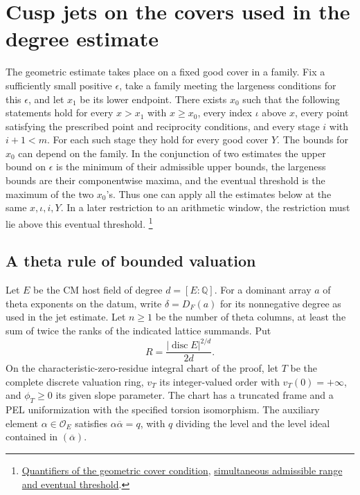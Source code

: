 \section{Cusp jets on the covers used in the degree estimate}
\label{sec:cusp-jets}

The geometric estimate takes place on a fixed good cover in a family.
Fix a sufficiently small positive \(\epsilon\), take a family meeting
the largeness conditions for this \(\epsilon\), and let \(x_1\) be its
lower endpoint. There exists \(x_0\) such that the following statements
hold for every \(x>x_1\) with \(x\ge x_0\), every index \(\iota\)
above \(x\), every point satisfying the prescribed point and
reciprocity conditions, and every stage \(i\) with \(i+1<m\).
For each such stage they hold for every good cover \(Y\).
The bounds for \(x_0\) can depend on the family. In the conjunction
of two estimates the upper bound on \(\epsilon\) is the minimum of
their admissible upper bounds, the largeness bounds are their
componentwise maxima, and the eventual threshold is the maximum of
the two \(x_0\)'s. Thus one can apply all the estimates below at the
same \(x,\iota,i,Y\). In a later restriction to an arithmetic
window, the restriction must lie above this eventual threshold.
\footnote{\href{https://github.com/Deicyde/riemann-hypothesis/blob/40e56bab/src/Development/AutomorphicArithmetic/ThetaCorrespondence/ThetaPairLifts/ThirdPlaceSeries/LiftLambdaBound.lean\#L17-L32}{Quantifiers of the geometric cover condition},
\href{https://github.com/Deicyde/riemann-hypothesis/blob/40e56bab/src/Development/AutomorphicArithmetic/ThetaCorrespondence/ThetaPairLifts/ThirdPlaceSeries/ExistsCuspWithThetaJetValueLe.lean\#L24-L43}{simultaneous admissible range and eventual threshold}.}

\subsection{A theta rule of bounded valuation}

Let \(E\) be the CM host field of degree \(d=[E:\mathbb Q]\).
For a dominant array \(a\) of theta exponents on the datum, write
\(\delta=D_F(a)\) for its nonnegative degree as used in the jet
estimate. Let \(n\ge1\) be the number of theta columns, at least
the sum of twice the ranks of the indicated lattice summands. Put
\[
            R=\frac{|\operatorname{disc}E|^{2/d}}{2d}.
\]
On the characteristic-zero-residue integral chart of the proof,
let \(T\) be the complete discrete valuation ring, \(v_T\) its
integer-valued order with \(v_T(0)=+\infty\), and \(\phi_T\ge0\) its
given slope parameter. The chart has a truncated frame and a PEL
uniformization with the specified torsion isomorphism. The auxiliary
element \(\alpha\in\mathcal O_E\) satisfies
\(\alpha\overline\alpha=q\), with \(q\) dividing the level and the
level ideal contained in \((\overline\alpha)\).

